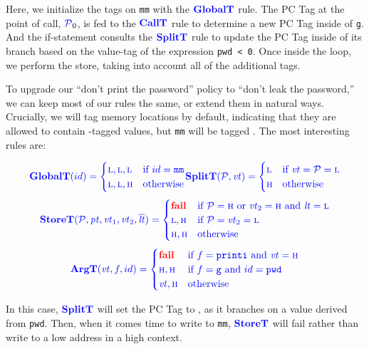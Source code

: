 \documentclass{llncs}
\begin{document}
Here, we initialize the tags on {\tt mm} with the \(\globaltname\) rule. The PC Tag
at the point of call, \(\PCT_0\), is fed to the \(\calltname\) rule to determine a new PC Tag
inside of {\tt g}. And the if-statement consults the \(\splittname\) rule to update the PC Tag
inside of its branch based on the value-tag of the expression {\tt pwd < 0}. Once inside the
loop, we perform the store, taking into account all of the additional tags.

To upgrade our ``don't print the password'' policy to ``don't leak the password,'' we can
keep most of our rules the same, or extend them in natural ways. Crucially, we will tag memory
locations \high by default, indicating that they are allowed to contain \high-tagged values,
but {\tt mm} will be tagged \low. The most interesting rules are:

\begin{align*}
  \globaltname(id) =
  \begin{cases}
    \low, \low, \low & \textnormal{if } id = \mathtt{mm} \\
    \low, \low, \high & \textnormal{otherwise} \\
  \end{cases} &
  \splittname(\PCT,\vt) =
  \begin{cases}
    \low & \textnormal{if } \vt = \PCT = \low \\
    \high & \textnormal{otherwise} \\
  \end{cases} \\
\end{align*}
\[\storet = \begin{cases}
  \fail & \textnormal{if } \PCT = \high \textnormal { or } \vt_2 = \high \textnormal{ and } \lt = \low \\
  \low, \high & \textnormal{if } \PCT = \vt_2 = \low \\
  \high, \high & \textnormal{otherwise} \\
\end{cases}\]
\[\argtname(\vt, f, id) = \begin{cases} \fail & \textnormal{if } f=\mathtt{printi} \textnormal{ and } \vt = \high \\
  \high, \high & \textnormal{if } f=\mathtt{g} \textnormal{ and } id = \mathtt{pwd} \\
  \vt, \high & \textnormal{otherwise} \\
\end{cases}\]

In this case, \(\splittname\) will set the PC Tag to \high, as it branches on a value derived from {\tt pwd}.
Then, when it comes time to write to {\tt mm}, \(\storetname\) will fail rather than write to a low address
in a high context.
\end{document}

